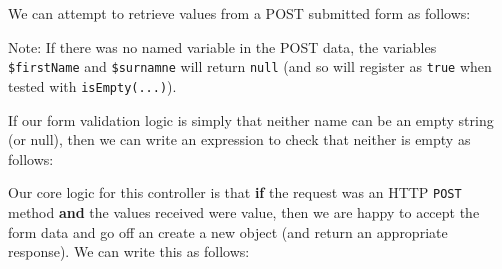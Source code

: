 \documentclass[a4paperpaper,openright]{book}
\newenvironment{Shaded}{}{}
\newcommand{\CommentTok}[1]{\textcolor[rgb]{0.38,0.63,0.69}{\textit{#1}}}
\newcommand{\KeywordTok}[1]{\textcolor[rgb]{0.00,0.44,0.13}{\textbf{#1}}}
\newcommand{\NormalTok}[1]{#1}
\newcommand{\OtherTok}[1]{\textcolor[rgb]{0.00,0.44,0.13}{#1}}
\newcommand{\StringTok}[1]{\textcolor[rgb]{0.25,0.44,0.63}{#1}}
\begin{document}
We can attempt to retrieve values from a POST submitted form as follows:

\begin{Shaded}
\end{Shaded}

Note: If there was no named variable in the POST data, the variables
\texttt{\$firstName} and \texttt{\$surnamne} will return \texttt{null}
(and so will register as \texttt{true} when tested with
\texttt{isEmpty(...)}).

If our form validation logic is simply that neither name can be an empty
string (or null), then we can write an expression to check that neither
is empty as follows:

\begin{Shaded}
\end{Shaded}

Our core logic for this controller is that \textbf{if} the request was
an HTTP \texttt{POST} method \textbf{and} the values received were
value, then we are happy to accept the form data and go off an create a
new object (and return an appropriate response). We can write this as
follows:

\begin{Shaded}
\end{Shaded}
\end{document}
